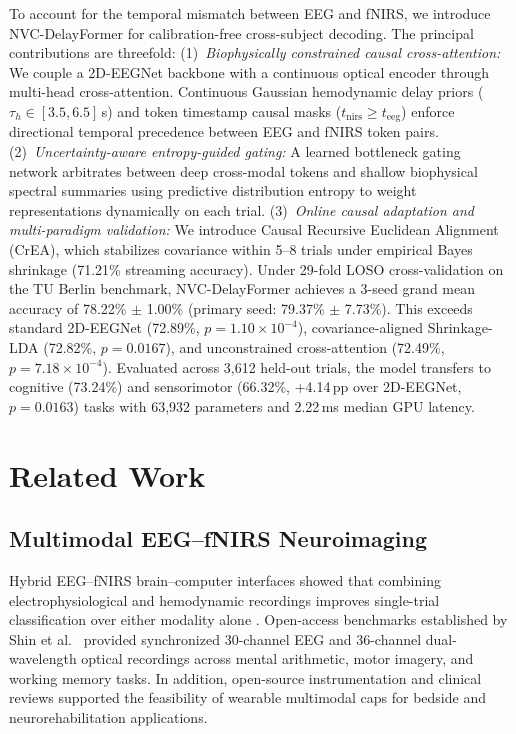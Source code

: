 \documentclass[journal]{IEEEtran}
\begin{document}
To account for the temporal mismatch between EEG and fNIRS, we introduce NVC-DelayFormer for calibration-free cross-subject decoding. The principal contributions are threefold:
(1)~\textit{Biophysically constrained causal cross-attention:} We couple a 2D-EEGNet backbone with a continuous optical encoder through multi-head cross-attention. Continuous Gaussian hemodynamic delay priors ($\tau_h \in [3.5, 6.5]$\,s) and token timestamp causal masks ($t_{\mathrm{nirs}} \ge t_{\mathrm{eeg}}$) enforce directional temporal precedence between EEG and fNIRS token pairs.
(2)~\textit{Uncertainty-aware entropy-guided gating:} A learned bottleneck gating network arbitrates between deep cross-modal tokens and shallow biophysical spectral summaries using predictive distribution entropy to weight representations dynamically on each trial.
(3)~\textit{Online causal adaptation and multi-paradigm validation:} We introduce Causal Recursive Euclidean Alignment (CrEA), which stabilizes covariance within 5--8 trials under empirical Bayes shrinkage (71.21\% streaming accuracy). Under 29-fold LOSO cross-validation on the TU Berlin benchmark, NVC-DelayFormer achieves a 3-seed grand mean accuracy of 78.22\% $\pm$ 1.00\% (primary seed: 79.37\% $\pm$ 7.73\%). This exceeds standard 2D-EEGNet (72.89\%, $p = 1.10\times 10^{-4}$), covariance-aligned Shrinkage-LDA (72.82\%, $p = 0.0167$), and unconstrained cross-attention (72.49\%, $p = 7.18\times 10^{-4}$). Evaluated across 3,612 held-out trials, the model transfers to cognitive (73.24\%) and sensorimotor (66.32\%, +4.14\,pp over 2D-EEGNet, $p = 0.0163$) tasks with 63,932 parameters and 2.22\,ms median GPU latency.

\section{Related Work}
\label{sec:related}
\subsection{Multimodal EEG--fNIRS Neuroimaging}
Hybrid EEG--fNIRS brain--computer interfaces showed that combining electrophysiological and hemodynamic recordings improves single-trial classification over either modality alone \cite{fazli2012enhanced, buccino2016hybrid}. Open-access benchmarks established by Shin et al.\ \cite{shin2017open, shin2018simultaneous} provided synchronized 30-channel EEG and 36-channel dual-wavelength optical recordings across mental arithmetic, motor imagery, and working memory tasks. In addition, open-source instrumentation \cite{vonluhmann2020open} and clinical reviews \cite{pinti2020present} supported the feasibility of wearable multimodal caps for bedside and neurorehabilitation applications.
\end{document}
